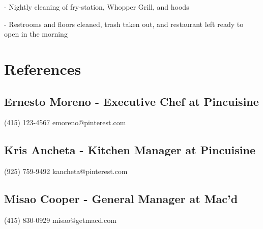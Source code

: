 \documentclass{article}
\begin{document}
\hspace{.25in} - Nightly cleaning of fry-station, Whopper Grill, and hoods

\hspace{.25in} - Restrooms and floors cleaned, trash taken out, and restaurant left ready to open in the morning



\section{References}

\subsection{Ernesto Moreno \hspace{.5in}	- Executive Chef at Pincuisine}

\hspace{-.4in}(415) 123-4567 
\hspace{1in} emoreno@pinterest.com

\vspace{.25in}

\subsection{Kris Ancheta	\hspace{.8in}- Kitchen Manager at Pincuisine}

\hspace{-.4in}(925) 759-9492 \hspace{1in} kancheta@pinterest.com


\vspace{.25in}

\subsection{Misao Cooper\hspace{.75in}	- General Manager at Mac'd}

\hspace{-.4in}(415) 830-0929 \hspace{1in} misao@getmacd.com
\end{document}
